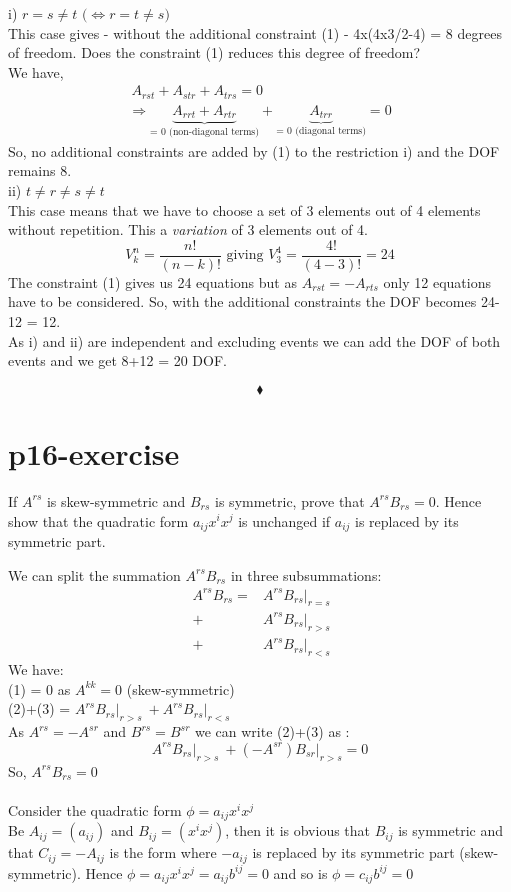 i) $r=s\neq t \text{ (}\Leftrightarrow r=t\neq s \text{)}$\\
This case gives - without the additional constraint (1) -  4x(4x3/2-4) = 8 degrees of freedom.
Does the constraint (1) reduces this degree of freedom?\\
We have, 
\begin{align}
\ A_{rst} + A_{str}+A_{trs} =0\\
\Rightarrow \underbrace{A_{rrt} + A_{rtr}}_\text{= 0 (non-diagonal terms)} + \underbrace{A_{trr}}_\text{= 0 (diagonal terms)} =0
\end{align}
So, no additional constraints are added by (1) to the restriction i) and the DOF remains 8.\\

ii) $t \neq r\neq s\neq t$\\
This case means that we have to choose a set of 3 elements out of 4 elements without repetition. This a \textit{variation} of 3 elements out of 4.
$$V^n_{k} = \frac{n!}{(n-k)!} \text{ giving } V^4_{3} = \frac{4!}{(4-3)!} = 24 $$
The constraint (1) gives us 24 equations but as  $A_{rst} = -A_{rts}$ only 12 equations have to be considered. So, with the  additional constraints the DOF becomes 24-12 = 12.\\
As i) and ii) are independent and excluding events we can add the DOF of both events and we get 8+12 = 20 DOF.

$$\blacklozenge$$
\pagebreak[4]

\section{p16-exercise}

\begin{tcolorbox}
If $A^{rs}$ is skew-symmetric and $B_{rs}$ is symmetric, prove that $A^{rs}B_{rs} = 0$. Hence show that the quadratic form $a_{ij}x^ix^j$ is unchanged if $a_{ij}$ is replaced by its symmetric part.
\end{tcolorbox}
We can split the summation $A^{rs}B_{rs}$ in three subsummations:
\begin{align}
\ A^{rs}B_{rs}  = &A^{rs}B_{rs} \vert_{r=s} \\
\ + &A^{rs}B_{rs}\vert_{r>s} \\
\ + &A^{rs}B_{rs}\vert_{r<s}
\end{align}
We have:\\
(1) = 0 as $A^{kk} = 0$ (skew-symmetric)\\
(2)+(3) = $A^{rs}B_{rs}\vert_{r>s} \ + A^{rs}B_{rs}\vert_{r<s}$\\
As $A^{rs} = -A^{sr}$ and $B^{rs} = B^{sr}$ we can write (2)+(3) as :
$$A^{rs}B_{rs}\vert_{r>s} \ + (-A^{sr})B_{sr}\vert_{r>s} = 0$$
So, $A^{rs}B_{rs} = 0$\\\\
Consider the quadratic form $\phi = a_{ij}x^ix^j$\\
Be $A_{ij} = (a_{ij})$ and $B_{ij} = (x^ix^j)$, then it is obvious that $B_{ij}$ is symmetric and that $C_{ij} = -A_{ij}$ is the form where $-a_{ij}$ is replaced by its symmetric part (skew-symmetric).
Hence $\phi = a_{ij}x^ix^j =a_{ij}b^{ij}= 0$ and so is $\phi = c_{ij}b^{ij}= 0$ 

